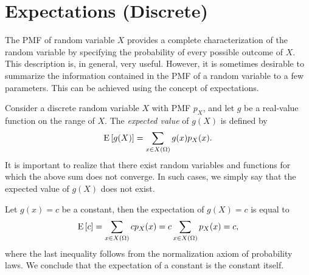 \chapter{Expectations (Discrete)}
\label{chapter:ExpectationsDiscrete}

The PMF of random variable $X$ provides a complete characterization of the  random variable by specifying the probability of every possible outcome of $X$.
This description is, in general, very useful.
However, it is sometimes desirable to summarize the information contained in the PMF of a random variable to a few parameters.
This can be achieved using the concept of expectations.

Consider a discrete random variable $X$ with PMF $p_X$, and let $g$ be a real-value function on the range of $X$.
The \emph{expected value} of $g(X)$ is defined by
\begin{equation} \label{equation:Expectation}
\mathrm{E} \left[ g(X) \right]
= \sum_{x \in X(\Omega)} g(x) p_X (x) .
\end{equation}
It is important to realize that there exist random variables and functions for which the above sum does not converge.
In such cases, we simply say that the expected value of $g(X)$ does not exist.

\begin{example}
Let $g(x) = c$ be a constant, then the expectation of $g(X) = c$ is equal to
\begin{equation*}
\mathrm{E} \left[ c \right]
= \sum_{x \in X(\Omega)} c p_X (x)
= c \sum_{x \in X(\Omega)} p_X (x)
= c,
\end{equation*}
where the last inequality follows from the normalization axiom of probability laws.
We conclude that the expectation of a constant is the constant itself.
\end{example}

